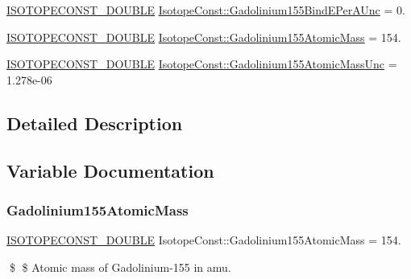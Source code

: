 \begin{DoxyCompactItemize}
\mbox{\hyperlink{group___isotope_const-_macros_ga8f45a7272ce02c0b4c65c44636ed719a}{I\+S\+O\+T\+O\+P\+E\+C\+O\+N\+S\+T\+\_\+\+D\+O\+U\+B\+LE}} \mbox{\hyperlink{group___isotope_const-_gadolinium-_gd155_gae8643c14eb9306e849007710dbbfdc87}{Isotope\+Const\+::\+Gadolinium155\+Bind\+E\+Per\+A\+Unc}} = 0.
\item 
\mbox{\hyperlink{group___isotope_const-_macros_ga8f45a7272ce02c0b4c65c44636ed719a}{I\+S\+O\+T\+O\+P\+E\+C\+O\+N\+S\+T\+\_\+\+D\+O\+U\+B\+LE}} \mbox{\hyperlink{group___isotope_const-_gadolinium-_gd155_gad0c5706152efc0a1e83d1a5738a4204f}{Isotope\+Const\+::\+Gadolinium155\+Atomic\+Mass}} = 154.
\item 
\mbox{\hyperlink{group___isotope_const-_macros_ga8f45a7272ce02c0b4c65c44636ed719a}{I\+S\+O\+T\+O\+P\+E\+C\+O\+N\+S\+T\+\_\+\+D\+O\+U\+B\+LE}} \mbox{\hyperlink{group___isotope_const-_gadolinium-_gd155_ga7a0f60314b4aa8dab914610e745d8fde}{Isotope\+Const\+::\+Gadolinium155\+Atomic\+Mass\+Unc}} = 1.\+278e-\/06
\end{DoxyCompactItemize}


\subsection{Detailed Description}


\subsection{Variable Documentation}
\mbox{\label{group___isotope_const-_gadolinium-_gd155_gad0c5706152efc0a1e83d1a5738a4204f}} 
\subsubsection{\texorpdfstring{Gadolinium155\+Atomic\+Mass}{Gadolinium155AtomicMass}}
{\footnotesize\ttfamily \mbox{\hyperlink{group___isotope_const-_macros_ga8f45a7272ce02c0b4c65c44636ed719a}{I\+S\+O\+T\+O\+P\+E\+C\+O\+N\+S\+T\+\_\+\+D\+O\+U\+B\+LE}} Isotope\+Const\+::\+Gadolinium155\+Atomic\+Mass = 154.}

\$ \$ Atomic mass of Gadolinium-\/155 in amu. \mbox{\label{group___isotope_const-_gadolinium-_gd155_ga7a0f60314b4aa8dab914610e745d8fde}} 
